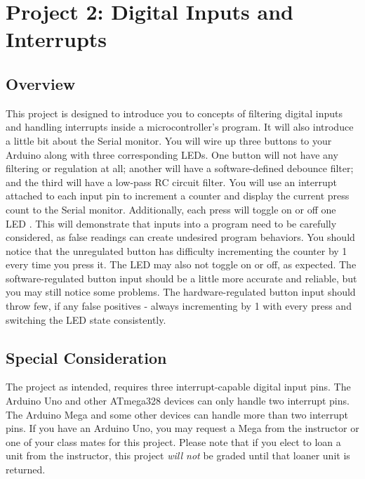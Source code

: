 %

\chapter{Project 2: Digital Inputs and Interrupts}

\section*{Overview}
This project is designed to introduce you to concepts of filtering digital inputs and handling interrupts inside a microcontroller's program. It will also introduce a little bit about the Serial monitor.
You will wire up three buttons to your Arduino along with three corresponding LEDs.
One button will not have any filtering or regulation at all; another will have a software-defined debounce filter; and the third will have a low-pass RC circuit filter.
You will use an interrupt attached to each input pin to increment a counter and display the current press count to the Serial monitor.
Additionally, each press will toggle on or off one LED .
This will demonstrate that inputs into a program need to be carefully considered, as false readings can create undesired program behaviors. 
You should notice that the unregulated button has difficulty incrementing the counter by 1 every time you press it.
The LED may also not toggle on or off, as expected.
The software-regulated button input should be a little more accurate and reliable, but you may still notice some problems.
The hardware-regulated button input should throw few, if any false positives - always incrementing by 1 with every press and switching the LED state consistently.

\section*{Special Consideration}
The project as intended, requires three interrupt-capable digital input pins. 
The Arduino Uno and other ATmega328 devices can only handle two interrupt pins.
The Arduino Mega and some other devices can handle more than two interrupt pins.
If you have an Arduino Uno, you may request a Mega from the instructor or one of your class mates for this project.
Please note that if you elect to loan a unit from the instructor, this project \emph{will not} be graded until that loaner unit is returned.

